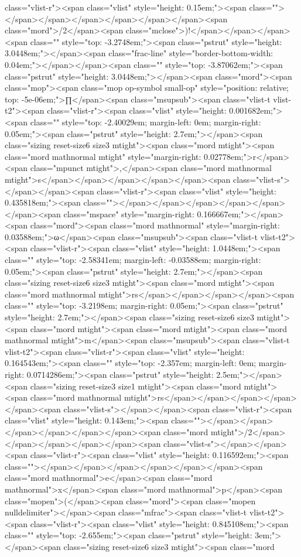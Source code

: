 class="vlist-r"><span class="vlist" style="height: 0.15em;"><span class=""></span></span></span></span></span></span><span class="mord">/2</span><span class="mclose">)!</span></span></span><span class="" style="top: -3.2748em;"><span class="pstrut" style="height: 3.0448em;"></span><span class="frac-line" style="border-bottom-width: 0.04em;"></span></span><span class="" style="top: -3.87062em;"><span class="pstrut" style="height: 3.0448em;"></span><span class="mord"><span class="mop"><span class="mop op-symbol small-op" style="position: relative; top: -5e-06em;">∏</span><span class="msupsub"><span class="vlist-t vlist-t2"><span class="vlist-r"><span class="vlist" style="height: 0.001682em;"><span class="" style="top: -2.40029em; margin-left: 0em; margin-right: 0.05em;"><span class="pstrut" style="height: 2.7em;"></span><span class="sizing reset-size6 size3 mtight"><span class="mord mtight"><span class="mord mathnormal mtight" style="margin-right: 0.02778em;">r</span><span class="mpunct mtight">,</span><span class="mord mathnormal mtight">s</span></span></span></span></span><span class="vlist-s">​</span></span><span class="vlist-r"><span class="vlist" style="height: 0.435818em;"><span class=""></span></span></span></span></span></span><span class="mspace" style="margin-right: 0.166667em;"></span><span class="mord"><span class="mord mathnormal" style="margin-right: 0.03588em;">ω</span><span class="msupsub"><span class="vlist-t vlist-t2"><span class="vlist-r"><span class="vlist" style="height: 1.0448em;"><span class="" style="top: -2.58341em; margin-left: -0.03588em; margin-right: 0.05em;"><span class="pstrut" style="height: 2.7em;"></span><span class="sizing reset-size6 size3 mtight"><span class="mord mtight"><span class="mord mathnormal mtight">rs</span></span></span></span><span class="" style="top: -3.2198em; margin-right: 0.05em;"><span class="pstrut" style="height: 2.7em;"></span><span class="sizing reset-size6 size3 mtight"><span class="mord mtight"><span class="mord mtight"><span class="mord mathnormal mtight">m</span><span class="msupsub"><span class="vlist-t vlist-t2"><span class="vlist-r"><span class="vlist" style="height: 0.164543em;"><span class="" style="top: -2.357em; margin-left: 0em; margin-right: 0.0714286em;"><span class="pstrut" style="height: 2.5em;"></span><span class="sizing reset-size3 size1 mtight"><span class="mord mtight"><span class="mord mathnormal mtight">rs</span></span></span></span></span><span class="vlist-s">​</span></span><span class="vlist-r"><span class="vlist" style="height: 0.143em;"><span class=""></span></span></span></span></span></span><span class="mord mtight">/2</span></span></span></span></span><span class="vlist-s">​</span></span><span class="vlist-r"><span class="vlist" style="height: 0.116592em;"><span class=""></span></span></span></span></span></span><span class="mord mathnormal">e</span><span class="mord mathnormal">x</span><span class="mord mathnormal">p</span><span class="mopen">(</span><span class="mord"><span class="mopen nulldelimiter"></span><span class="mfrac"><span class="vlist-t vlist-t2"><span class="vlist-r"><span class="vlist" style="height: 0.845108em;"><span class="" style="top: -2.655em;"><span class="pstrut" style="height: 3em;"></span><span class="sizing reset-size6 size3 mtight"><span class="mord 